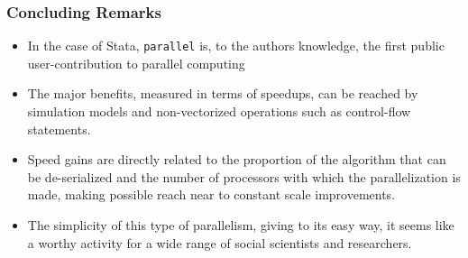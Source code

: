 \documentclass[11pt, handout]{beamer}
\begin{document}
\begin{frame}
\frametitle{Concluding Remarks}

\begin{itemize}[<-+>]
\item In the case of Stata, {\tt parallel} is, to the authors knowledge, the first public user-contribution to parallel computing
\item The major benefits, measured in terms of speedups, can be reached by simulation models and non-vectorized operations such as control-flow statements.
\item Speed gains are directly related to the proportion of the algorithm that can be de-serialized and the number of processors with which the parallelization is made, making possible reach near to constant scale improvements.
\item The simplicity of this type of parallelism, giving to its easy way, it seems like a worthy activity for a wide range of social scientists and researchers.
\end{itemize}

\end{frame}

\frame{\maketitle}
\end{document}
